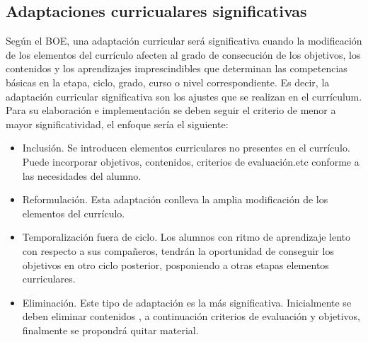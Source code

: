 \subsection{Adaptaciones curricualares significativas}
Según el BOE, una adaptación curricular será significativa cuando la modificación de los elementos del currículo afecten al grado de consecución de los objetivos, los contenidos y los aprendizajes imprescindibles que determinan las competencias básicas en la etapa, ciclo, grado, curso o nivel correspondiente. 
Es decir, la adaptación curricular significativa son los ajustes que se realizan en el currículum. Para su elaboración e implementación se deben seguir el criterio de menor a mayor significatividad, el enfoque sería el siguiente:
\begin{itemize}
    \item Inclusión. Se introducen elementos curriculares no presentes en el currículo. Puede incorporar objetivos, contenidos, criterios de evaluación.etc conforme a las necesidades del alumno.
    \item Reformulación. Esta adaptación conlleva la amplia modificación de los elementos del currículo.
    \item Temporalización fuera de ciclo. Los alumnos con ritmo de aprendizaje lento con respecto a sus compañeros, tendrán la oportunidad de conseguir los objetivos en otro ciclo posterior, posponiendo a otras etapas elementos curriculares.
    \item Eliminación. Este tipo de adaptación es la más significativa. Inicialmente se deben eliminar contenidos , a continuación criterios de evaluación y objetivos, finalmente se propondrá quitar material.
\end{itemize}

